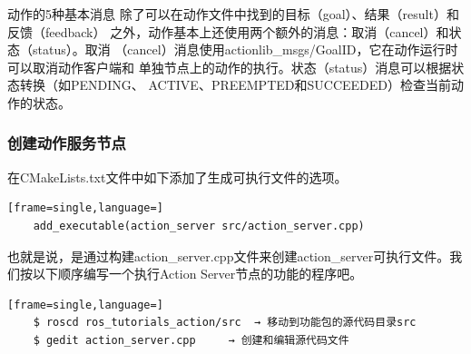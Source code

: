 \documentclass[geye,green,kindle,cn]{elegantnote}
\begin{document}
动作的5种基本消息 除了可以在动作文件中找到的目标（goal）、结果（result）和反馈（feedback） 之外，动作基本上还使用两个额外的消息：取消（cancel）和状态（status）。取消 （cancel）消息使用actionlib\_msgs/GoalID，它在动作运行时可以取消动作客户端和 单独节点上的动作的执行。状态（status）消息可以根据状态转换（如PENDING、 ACTIVE、PREEMPTED和SUCCEEDED）检查当前动作的状态。 
\subsubsection{创建动作服务节点}
在CMakeLists.txt文件中如下添加了生成可执行文件的选项。 
\begin{lstlisting}[frame=single,language=]
    add_executable(action_server src/action_server.cpp)
\end{lstlisting}

也就是说，是通过构建action\_server.cpp文件来创建action\_server可执行文件。我们按以下顺序编写一个执行Action Server节点的功能的程序吧。
\begin{lstlisting}[frame=single,language=]
    $ roscd ros_tutorials_action/src  → 移动到功能包的源代码目录src 
    $ gedit action_server.cpp     → 创建和编辑源代码文件
\end{lstlisting}
\end{document}
